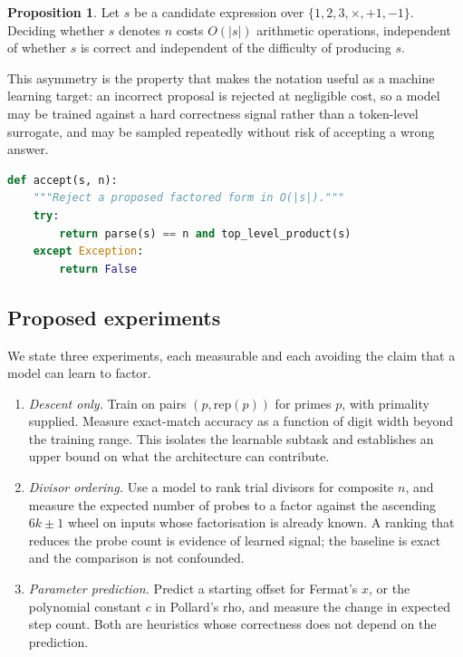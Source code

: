 \documentclass[11pt]{article}
\theoremstyle{definition}
\newtheorem{proposition}{Proposition}
\begin{document}
\begin{proposition}\label{prop:asym}
Let $s$ be a candidate expression over $\{1,2,3,\times,+1,-1\}$. Deciding
whether $s$ denotes $n$ costs $O(|s|)$ arithmetic operations, independent of
whether $s$ is correct and independent of the difficulty of producing $s$.
\end{proposition}

This asymmetry is the property that makes the notation useful as a machine
learning target: an incorrect proposal is rejected at negligible cost, so a
model may be trained against a hard correctness signal rather than a
token-level surrogate, and may be sampled repeatedly without risk of accepting
a wrong answer.

\begin{lstlisting}[language=Python]
def accept(s, n):
    """Reject a proposed factored form in O(|s|)."""
    try:
        return parse(s) == n and top_level_product(s)
    except Exception:
        return False
\end{lstlisting}

\subsection{Proposed experiments}

We state three experiments, each measurable and each avoiding the claim that a
model can learn to factor.

\begin{enumerate}
  \item \emph{Descent only.} Train on pairs $(p, \mathrm{rep}(p))$ for primes
        $p$, with primality supplied. Measure exact-match accuracy as a
        function of digit width beyond the training range. This isolates the
        learnable subtask and establishes an upper bound on what the
        architecture can contribute.
  \item \emph{Divisor ordering.} Use a model to rank trial divisors for
        composite $n$, and measure the expected number of probes to a factor
        against the ascending $6k\pm1$ wheel on inputs whose factorisation is
        already known. A ranking that reduces the probe count is evidence of
        learned signal; the baseline is exact and the comparison is not
        confounded.
  \item \emph{Parameter prediction.} Predict a starting offset for Fermat's
        $x$, or the polynomial constant $c$ in Pollard's rho, and measure the
        change in expected step count. Both are heuristics whose correctness
        does not depend on the prediction.
\end{enumerate}
\end{document}
